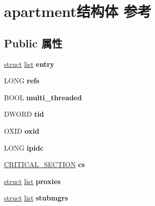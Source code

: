 \hypertarget{structapartment}{}\section{apartment结构体 参考}
\label{structapartment}
\subsection*{Public 属性}
\begin{DoxyCompactItemize}
\item 
\mbox{\label{structapartment_a3135082f14bf98b4bf326ee2fb8f79ea}} 
\hyperlink{interfacestruct}{struct} \hyperlink{classlist}{list} {\bfseries entry}
\item 
\mbox{\label{structapartment_ad2b04cb866fb5f764213495c0abb0df2}} 
L\+O\+NG {\bfseries refs}
\item 
\mbox{\label{structapartment_afb5ceaeb802827e42aaca5b2a20aee2c}} 
B\+O\+OL {\bfseries multi\+\_\+threaded}
\item 
\mbox{\label{structapartment_a28da709a1c33cd93bae85b9757ea97ca}} 
D\+W\+O\+RD {\bfseries tid}
\item 
\mbox{\label{structapartment_a31c27e521e0497138b47e9ace84e08f0}} 
O\+X\+ID {\bfseries oxid}
\item 
\mbox{\label{structapartment_a698614cf096d7be39ca5d4cd0428303f}} 
L\+O\+NG {\bfseries ipidc}
\item 
\mbox{\label{structapartment_a81ec35ce5e7fd4a284a17d952787fd4e}} 
\hyperlink{struct___c_r_i_t_i_c_a_l___s_e_c_t_i_o_n}{C\+R\+I\+T\+I\+C\+A\+L\+\_\+\+S\+E\+C\+T\+I\+ON} {\bfseries cs}
\item 
\mbox{\label{structapartment_a01477ee8715a3a0af7be1c7437c06d56}} 
\hyperlink{interfacestruct}{struct} \hyperlink{classlist}{list} {\bfseries proxies}
\item 
\mbox{\label{structapartment_ad8838120328de6d86793ecd53ecc9b64}} 
\hyperlink{interfacestruct}{struct} \hyperlink{classlist}{list} {\bfseries stubmgrs}

\end{DoxyCompactItemize}
